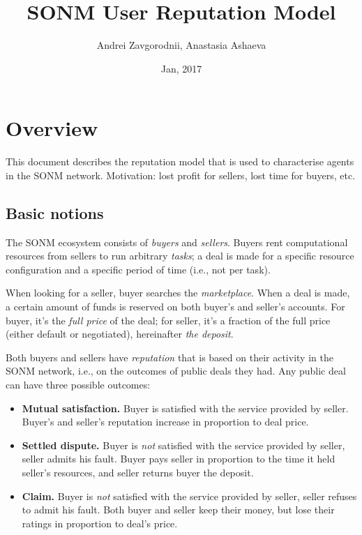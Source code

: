 \documentclass[11pt]{article}
\title{SONM User Reputation Model}
\author{Andrei Zavgorodnii, Anastasia Ashaeva}
\date{Jan, 2017}
\begin{document}
\maketitle
\tableofcontents

\section{Overview} \label{overview}

This document describes the reputation model that is used to characterise agents in the SONM network. Motivation: lost profit for sellers, lost time for buyers, etc.

\subsection{Basic notions} \label{basicNotions}

The SONM ecosystem consists of \textit{buyers} and \textit{sellers}. Buyers rent computational resources from sellers to run arbitrary \textit{tasks}; a deal is made for a specific resource configuration and a specific period of time (i.e., not per task).

When looking for a seller, buyer searches the \textit{marketplace}. When a deal is made, a certain amount of funds is reserved on both buyer's and seller's accounts. For buyer, it's the \textit{full price} of the deal; for seller, it's a fraction of the full price (either default or negotiated), hereinafter \textit{the deposit}.

Both buyers and sellers have \textit{reputation} that is based on their activity in the SONM network, i.e., on the outcomes of public deals they had. Any public deal can have three possible outcomes:

\begin{itemize}
\item \textbf{Mutual satisfaction.} Buyer is satisfied with the service provided by seller. Buyer's and seller's reputation increase in proportion to deal price.
\item \textbf{Settled dispute.} Buyer is \textit{not} satisfied with the service provided by seller, seller admits his fault. Buyer pays seller in proportion to the time it held seller's resources, and seller returns buyer the deposit.
\item \textbf{Claim.} Buyer is \textit{not} satisfied with the service provided by seller, seller refuses to admit his fault. Both buyer and seller keep their money, but lose their ratings in proportion to deal's price.
\end{itemize}
\end{document}
